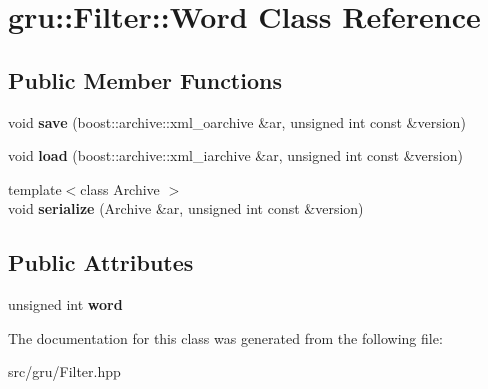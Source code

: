 \hypertarget{classgru_1_1Filter_1_1Word}{\section{gru\-:\-:\-Filter\-:\-:\-Word \-Class \-Reference}
\label{classgru_1_1Filter_1_1Word}
}
\subsection*{\-Public \-Member \-Functions}
\begin{DoxyCompactItemize}
\item 
\hypertarget{classgru_1_1Filter_1_1Word_abd93e648d0dcf086db85c469e41a36db}{void {\bfseries save} (boost\-::archive\-::xml\-\_\-oarchive \&ar, unsigned int const \&version)}\label{classgru_1_1Filter_1_1Word_abd93e648d0dcf086db85c469e41a36db}

\item 
\hypertarget{classgru_1_1Filter_1_1Word_a99f9a6fa7915c5d6c49f793b4e892fc5}{void {\bfseries load} (boost\-::archive\-::xml\-\_\-iarchive \&ar, unsigned int const \&version)}\label{classgru_1_1Filter_1_1Word_a99f9a6fa7915c5d6c49f793b4e892fc5}

\item 
\hypertarget{classgru_1_1Filter_1_1Word_a81eb1c5fa168544f2db38217592f5886}{{\footnotesize template$<$class Archive $>$ }\\void {\bfseries serialize} (\-Archive \&ar, unsigned int const \&version)}\label{classgru_1_1Filter_1_1Word_a81eb1c5fa168544f2db38217592f5886}

\end{DoxyCompactItemize}
\subsection*{\-Public \-Attributes}
\begin{DoxyCompactItemize}
\item 
\hypertarget{classgru_1_1Filter_1_1Word_a799a718a876137155e1f823330cad2de}{unsigned int {\bfseries word}}\label{classgru_1_1Filter_1_1Word_a799a718a876137155e1f823330cad2de}

\end{DoxyCompactItemize}


\-The documentation for this class was generated from the following file\-:\begin{DoxyCompactItemize}
\item 
src/gru/\-Filter.\-hpp\end{DoxyCompactItemize}
